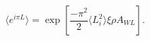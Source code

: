\begin{equation}
\label{rightlaw}
\langle e^{i\pi L}\rangle=\exp [\frac{-\pi^2}{2}\langle L_i^2\rangle \xi \rho A_{WL}].
\end{equation}

